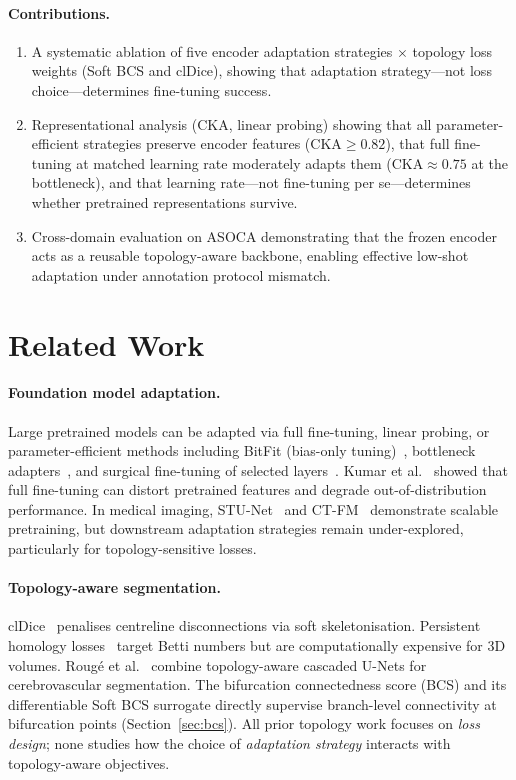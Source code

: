 \documentclass[runningheads]{llncs}
\begin{document}
\paragraph{Contributions.}
\begin{enumerate}
    \item A systematic ablation of five encoder adaptation strategies $\times$ topology loss weights (Soft BCS and clDice), showing that adaptation strategy---not loss choice---determines fine-tuning success.
    \item Representational analysis (CKA, linear probing) showing that all parameter-efficient strategies preserve encoder features (CKA${\geq}0.82$), that full fine-tuning at matched learning rate moderately adapts them (CKA${\approx}0.75$ at the bottleneck), and that learning rate---not fine-tuning per se---determines whether pretrained representations survive.
    \item Cross-domain evaluation on ASOCA demonstrating that the frozen encoder acts as a reusable topology-aware backbone, enabling effective low-shot adaptation under annotation protocol mismatch.
\end{enumerate}

\section{Related Work}

\paragraph{Foundation model adaptation.}
Large pretrained models can be adapted via full fine-tuning, linear probing, or parameter-efficient methods including BitFit (bias-only tuning)~\cite{zaken_bitfit_2022}, bottleneck adapters~\cite{houlsby_adapters_2019,chen_adaptformer_2022}, and surgical fine-tuning of selected layers~\cite{lee_surgical_2023}.
Kumar et al.~\cite{kumar_finetuning_2022} showed that full fine-tuning can distort pretrained features and degrade out-of-distribution performance.
In medical imaging, STU-Net~\cite{huang_stu_2023} and CT-FM~\cite{pai_ctfm_2025} demonstrate scalable pretraining, but downstream adaptation strategies remain under-explored, particularly for topology-sensitive losses.

\paragraph{Topology-aware segmentation.}
clDice~\cite{shit_cldice_2021} penalises centreline disconnections via soft skeletonisation.
Persistent homology losses~\cite{clough_topological_2022,hu_topology_2019} target Betti numbers but are computationally expensive for 3D volumes.
Roug\'e et al.~\cite{rouge_topology_2024} combine topology-aware cascaded U-Nets for cerebrovascular segmentation.
The bifurcation connectedness score (BCS) and its differentiable Soft BCS surrogate directly supervise branch-level connectivity at bifurcation points (Section~\ref{sec:bcs}).
All prior topology work focuses on \emph{loss design}; none studies how the choice of \emph{adaptation strategy} interacts with topology-aware objectives.
\end{document}
